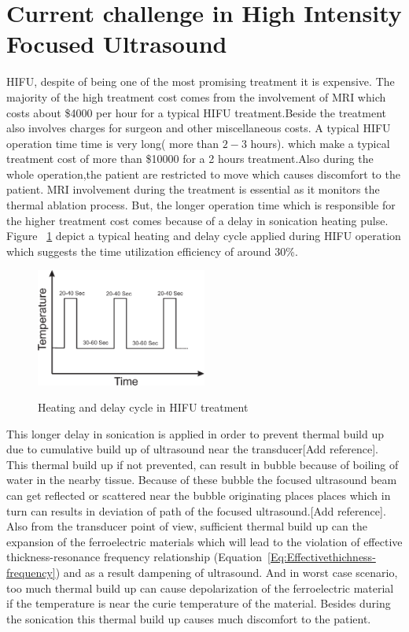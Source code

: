 \section{Current challenge in High Intensity Focused Ultrasound}
HIFU, despite of being one of the most promising treatment it is expensive. The majority of the high treatment cost comes from the involvement of MRI which costs about \$4000 per hour for a typical HIFU treatment.Beside the treatment also involves charges for surgeon and other miscellaneous costs. A typical HIFU operation time time is very long( more than $2-3$ hours).  which make a typical treatment cost of more than \$10000 for a 2 hours treatment.Also during the whole operation,the patient are restricted to move which causes discomfort to the patient. MRI involvement during the treatment is essential as it monitors the thermal ablation process. But, the longer operation time which is responsible for the higher treatment cost comes because of a delay in sonication heating pulse. Figure ~\ref{fig:Heating and Cooling pulse in HIFU treatment} depict a typical heating and delay cycle applied during HIFU operation which suggests the time utilization efficiency of around $30$\%.\begin{figure}[t]
\centering
	\includegraphics[width=0.5\textwidth]{HeatingandCoolingpulse.eps}\\
	\caption[Heating and delay cycle in HIFU treatment]{Heating and delay cycle in HIFU treatment}\label{fig:Heating and Cooling pulse in HIFU treatment}
\end{figure} This longer delay in sonication is applied in order to prevent thermal build up due to cumulative build up of ultrasound  near the transducer[Add reference]. This thermal build up if not prevented, can result in bubble because of boiling of water in the nearby tissue. Because of these bubble the focused ultrasound beam can get reflected or scattered near the bubble originating places places which in turn can results in deviation of path of the focused ultrasound.[Add reference]. Also from the transducer point of view, sufficient thermal build up can the expansion of the ferroelectric materials which will lead to the violation of  effective thickness-resonance frequency relationship (Equation~\ref{Eq:Effectivethichness-frequency})  and as a result dampening of ultrasound. And in worst case scenario, too much thermal build up can cause depolarization of the ferroelectric material if the temperature is near the curie temperature of the material. Besides during the sonication this thermal build up causes much discomfort to the patient.

